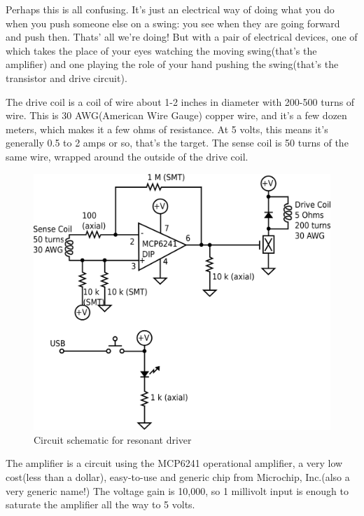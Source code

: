 Perhaps this is all confusing. It's just an electrical way of doing what
you do when you push someone else on a swing: you see when they are
going forward and push then. Thats' all we're doing! But with a pair of
electrical devices, one of which takes the place of your eyes watching
the moving swing(that's the amplifier) and one playing the role of your
hand pushing the swing(that's the transistor and drive circuit).

The drive coil is a coil of wire about 1-2 inches in diameter with
200-500 turns of wire. This is 30 AWG(American Wire Gauge) copper wire,
and it's a few dozen meters, which makes it a few ohms of resistance. At
5 volts, this means it's generally 0.5 to 2 amps or so, that's the
target. The sense coil is 50 turns of the same wire, wrapped around the
outside of the drive coil.

\begin{figure}[htbp]
\centering
\includegraphics{images/resonantStick1.png}
\caption{Circuit schematic for resonant driver}
\end{figure}

The amplifier is a circuit using the MCP6241 operational amplifier, a
very low cost(less than a dollar), easy-to-use and generic chip from
Microchip, Inc.(also a very generic name!) The voltage gain is 10,000,
so 1 millivolt input is enough to saturate the amplifier all the way to
5 volts.

